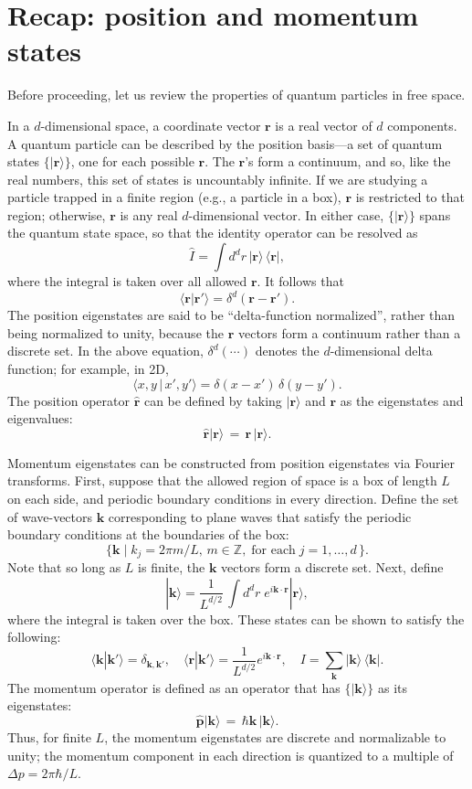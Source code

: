 \documentclass[pra,12pt]{revtex4}
\begin{document}
\section{Recap: position and momentum states}

Before proceeding, let us review the properties of quantum particles
in free space.

In a $d$-dimensional space, a coordinate vector $\mathbf{r}$ is a real
vector of $d$ components.  A quantum particle can be described by the
position basis---a set of quantum states $\{|\mathbf{r}\rangle\}$, one
for each possible $\mathbf{r}$.  The $\mathbf{r}$'s form a continuum,
and so, like the real numbers, this set of states is uncountably
infinite.  If we are studying a particle trapped in a finite region
(e.g., a particle in a box), $\mathbf{r}$ is restricted to that
region; otherwise, $\mathbf{r}$ is any real $d$-dimensional vector.
In either case, $\{|\mathbf{r}\rangle\}$ spans the quantum
state space, so that the identity operator can be resolved as
$$\hat{I} = \int d^dr \, |\mathbf{r}\rangle \,\langle\mathbf{r}|,$$
where the integral is taken over all allowed $\mathbf{r}$.  It
follows that
$$\langle \mathbf{r} | \mathbf{r}' \rangle = \delta^d(\mathbf{r}-\mathbf{r}').$$
The position eigenstates are said to be ``delta-function normalized'',
rather than being normalized to unity, because the $\mathbf{r}$
vectors form a continuum rather than a discrete set.  In the above
equation, $\delta^d(\cdots)$ denotes the $d$-dimensional delta
function; for example, in 2D,
$$\langle x,y \,|\, x',y' \rangle = \delta(x-x') \, \delta(y-y').$$
The position operator $\hat{\mathbf{r}}$ can be defined by taking
$|\mathbf{r}\rangle$ and $\mathbf{r}$ as the eigenstates and
eigenvalues:
$$\hat{\mathbf{r}} |\mathbf{r}\rangle \,=\, \mathbf{r}\, |\mathbf{r}\rangle.$$

Momentum eigenstates can be constructed from position eigenstates via
Fourier transforms.  First, suppose that the allowed region of space
is a box of length $L$ on each side, and periodic boundary conditions
in every direction.  Define the set of wave-vectors $\mathbf{k}$
corresponding to plane waves that satisfy the periodic boundary
conditions at the boundaries of the box:
$$\Big\{\mathbf{k}  \; \Big| \; k_j = 2\pi m/L, \,m\in\mathbb{Z}, \;\text{for each} \; j = 1, \dots,d\, \Big\}.$$
Note that so long as $L$ is finite, the $\mathbf{k}$ vectors form a
discrete set.  Next, define
$$|\mathbf{k}\rangle = \frac{1}{L^{d/2}} \, \int d^dr \; e^{i\mathbf{k}\cdot\mathbf{r}} |\mathbf{r}\rangle,$$
where the integral is taken over the box.  These states
can be shown to satisfy the following:
$$\langle\mathbf{k}|\mathbf{k}'\rangle = \delta_{\mathbf{k},\mathbf{k}'}, \quad \langle\mathbf{r}|\mathbf{k}'\rangle = \frac{1}{L^{d/2}} e^{i\mathbf{k}\cdot\mathbf{r}}, \quad I = \sum_{\mathbf{k}} |\mathbf{k}\rangle\,\langle\mathbf{k}|.$$
The momentum operator is defined as an operator that has
$\{|\mathbf{k}\rangle\}$ as its eigenstates:
$$\hat{\mathbf{p}} |\mathbf{k}\rangle \,=\, \hbar \mathbf{k}\, |\mathbf{k}\rangle.$$
Thus, for finite $L$, the momentum eigenstates are discrete and
normalizable to unity; the momentum component in each direction is
quantized to a multiple of $\Delta p = 2\pi\hbar/L$.
\end{document}
